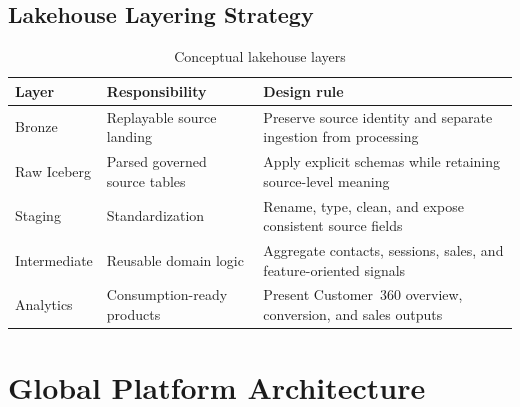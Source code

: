 \subsection{Lakehouse Layering Strategy}
\begin{table}[htbp]
    \centering
    \small
    \begin{tabularx}{\textwidth}{|p{}|p{}|X|}
        \hline
        \rowcolor{ModernTableHeader}
        \color{white}\textbf{Layer} & \color{white}\textbf{Responsibility} & \color{white}\textbf{Design rule} \\
        \hline
        Bronze & Replayable source landing & Preserve source identity and separate ingestion from processing \\
        \hline
        Raw Iceberg & Parsed governed source tables & Apply explicit schemas while retaining source-level meaning \\
        \hline
        Staging & Standardization & Rename, type, clean, and expose consistent source fields \\
        \hline
        Intermediate & Reusable domain logic & Aggregate contacts, sessions, sales, and feature-oriented signals \\
        \hline
        Analytics & Consumption-ready products & Present Customer~360 overview, conversion, and sales outputs \\
        \hline
    \end{tabularx}
    \caption{Conceptual lakehouse layers}
    \label{tab:design-lakehouse-layers}
\end{table}

\section{Global Platform Architecture}


